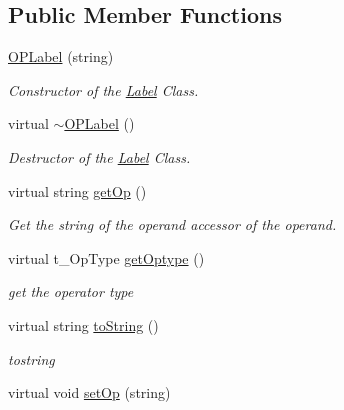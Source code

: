 \subsection*{Public Member Functions}
\begin{DoxyCompactItemize}
\item 
\hypertarget{classOPLabel_a5405b78894658047362a328e750f88b4}{
\hyperlink{classOPLabel_a5405b78894658047362a328e750f88b4}{OPLabel} (string)}
\label{classOPLabel_a5405b78894658047362a328e750f88b4}

\begin{DoxyCompactList}\small\item\em Constructor of the \hyperlink{classLabel}{Label} Class. \item\end{DoxyCompactList}\item 
\hypertarget{classOPLabel_ab25553d41606e880a622e09d5c09129d}{
virtual \hyperlink{classOPLabel_ab25553d41606e880a622e09d5c09129d}{$\sim$OPLabel} ()}
\label{classOPLabel_ab25553d41606e880a622e09d5c09129d}

\begin{DoxyCompactList}\small\item\em Destructor of the \hyperlink{classLabel}{Label} Class. \item\end{DoxyCompactList}\item 
\hypertarget{classOPLabel_aa41863a748c2fad74e219da9681932e7}{
virtual string \hyperlink{classOPLabel_aa41863a748c2fad74e219da9681932e7}{getOp} ()}
\label{classOPLabel_aa41863a748c2fad74e219da9681932e7}

\begin{DoxyCompactList}\small\item\em Get the string of the operand accessor of the operand. \item\end{DoxyCompactList}\item 
virtual t\_\-OpType \hyperlink{classOPLabel_a840489088fc49c57b02264089ec4c55b}{getOptype} ()
\begin{DoxyCompactList}\small\item\em get the operator type \item\end{DoxyCompactList}\item 
virtual string \hyperlink{classOPLabel_a94c9cdc5cf0b3af05a1f917c0d650056}{toString} ()
\begin{DoxyCompactList}\small\item\em tostring \item\end{DoxyCompactList}\item 
\hypertarget{classOPLabel_a10e5dfb1f7b2eee9f2327cd2601ed9be}{
virtual void \hyperlink{classOPLabel_a10e5dfb1f7b2eee9f2327cd2601ed9be}{setOp} (string)}
\label{classOPLabel_a10e5dfb1f7b2eee9f2327cd2601ed9be}


\end{DoxyCompactItemize}
